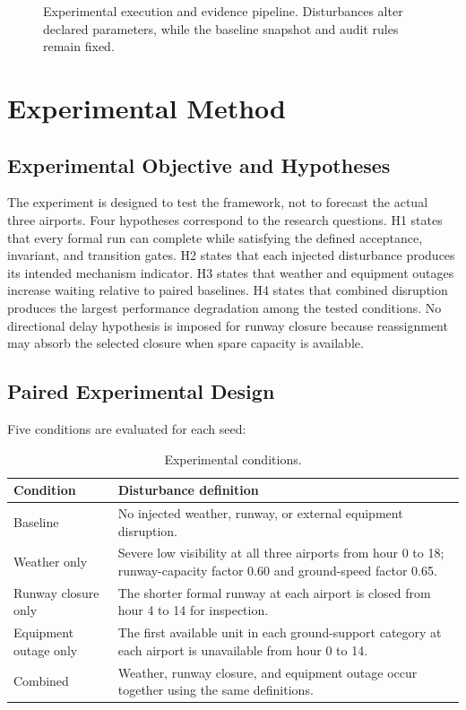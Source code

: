 \documentclass[runningheads]{llncs}
\begin{document}
\begin{figure}[t]
\centering
{}
\caption{Experimental execution and evidence pipeline. Disturbances alter declared parameters, while the baseline snapshot and audit rules remain fixed.}\label{fig:pipeline}
\end{figure}

\section{Experimental Method}
\subsection{Experimental Objective and Hypotheses}
The experiment is designed to test the framework, not to forecast the actual three airports. Four hypotheses correspond to the research questions. H1 states that every formal run can complete while satisfying the defined acceptance, invariant, and transition gates. H2 states that each injected disturbance produces its intended mechanism indicator. H3 states that weather and equipment outages increase waiting relative to paired baselines. H4 states that combined disruption produces the largest performance degradation among the tested conditions. No directional delay hypothesis is imposed for runway closure because reassignment may absorb the selected closure when spare capacity is available.
\subsection{Paired Experimental Design}
Five conditions are evaluated for each seed:
\begin{table}[t]
\caption{Experimental conditions.}\label{tab:conditions}
\centering\small
\begin{tabular}{p{2.7cm}p{8.1cm}}
\toprule
Condition & Disturbance definition \\
\midrule
Baseline & No injected weather, runway, or external equipment disruption. \\
Weather only & Severe low visibility at all three airports from hour 0 to 18; runway-capacity factor 0.60 and ground-speed factor 0.65. \\
Runway closure only & The shorter formal runway at each airport is closed from hour 4 to 14 for inspection. \\
Equipment outage only & The first available unit in each ground-support category at each airport is unavailable from hour 0 to 14. \\
Combined & Weather, runway closure, and equipment outage occur together using the same definitions. \\
\bottomrule
\end{tabular}
\end{table}
\end{document}
